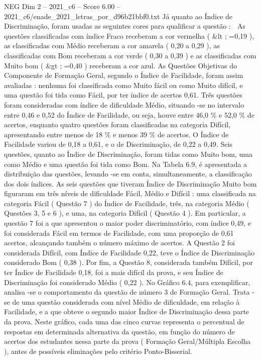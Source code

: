 \begin{textsample}{NEG Dim 2 – 2021\_c6 – Score 6.00 – 2021\_c6/enade\_2021\_letras\_por\_d96b21bbf0.txt}
Já quanto ao Índice de Discriminação, foram usadas as seguintes cores para qualificar a questão :  As questões classificadas com índice Fraco receberam a cor vermelha ( \&lt ; =0,19 ), as classificadas com Médio receberam a cor amarela ( 0,20 a 0,29 ), as classificadas com Bom receberam a cor verde ( 0,30 a 0,39 ) e as classificadas com Muito bom ( \&gt ; =0,40 ) receberam a cor azul.
As Questões Objetivas do Componente de Formação Geral, segundo o Índice de Facilidade, foram assim avaliadas : nenhuma foi classificada como Muito fácil ou como Muito difícil, e uma questão foi tida como Fácil, por ter índice de acertos 0,61.
Três questões foram consideradas com índice de dificuldade Médio, situando -se no intervalo entre 0,46 e 0,52 do Índice de Facilidade, ou seja, houve entre 46,0 \% e 52,0 \% de acertos, enquanto quatro questões foram classificadas na categoria Difícil, apresentando entre menos de 18 \% e menos 39 \% de acertos.
O Índice de Facilidade variou de 0,18 a 0,61, e o de Discriminação, de 0,22 a 0,49.
Seis questões, quanto ao Índice de Discriminação, foram tidas como Muito bom, uma como Médio e uma questão foi tida como Bom.
Na Tabela 6.9, é apresentada a distribuição das questões, levando -se em conta, simultaneamente, a classificação dos dois índices.
As seis questões que tiveram Índice de Discriminação Muito bom figuraram em três níveis de dificuldade Fácil, Médio e Difícil : uma classificada na categoria Fácil ( Questão 7 ) do Índice de Facilidade, três, na categoria Médio ( Questões 3, 5 e 6 ), e uma, na categoria Difícil ( Questão 4 ).
Em particular, a questão 7 foi a que apresentou o maior poder discriminatório, com índice 0,49, e foi considerada Fácil em termos de Facilidade, com uma proporção de 0,61 acertos, alcançando também o número máximo de acertos.
A Questão 2 foi considerada Difícil, com Índice de Facilidade 0,22, teve o Índice de Discriminação considerado Bom ( 0,38 ).
Por fim, a Questão 8, considerada também Difícil, por ter Índice de Facilidade 0,18, foi a mais difícil da prova, e seu Índice de Discriminação foi considerado Médio ( 0,22 ).
No Gráfico 6.4, para exemplificar, analisa -se o comportamento da questão de número 3 de Formação Geral.
Trata -se de uma questão considerada com nível Médio de dificuldade, em relação à Facilidade, e a que obteve o segundo maior Índice de Discriminação dessa parte da prova.
Neste gráfico, cada uma das cinco curvas representa o percentual de respostas em determinada alternativa da questão, em função do número de acertos dos estudantes nessa parte da prova ( Formação Geral/Múltipla Escolha ), antes de possíveis eliminações pelo critério Ponto-Bisserial.

\end{textsample}
